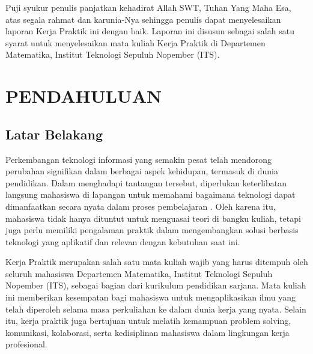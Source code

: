 \documentclass{file/KP-ITS}
\theoremstyle{definition}
\theoremstyle{definition}
\theoremstyle{plain}
\begin{document}

\BagianAwal
\Cover
\LembarJudul
\TitlePage
\LembarPengesahanDepartemen
\LembarPengesahanInstansi
\LembarOrisinalitas

\restoregeometry
\KataPengantar
Puji syukur penulis panjatkan kehadirat Allah SWT, Tuhan Yang Maha Esa, atas segala rahmat dan karunia-Nya sehingga penulis dapat menyelesaikan laporan Kerja Praktik ini dengan baik. Laporan ini disusun sebagai salah satu syarat untuk menyelesaikan mata kuliah Kerja Praktik di Departemen Matematika, Institut Teknologi Sepuluh Nopember (ITS).


\DaftarIsi

\DaftarGambar

\DaftarTabel





\BagianInti

\chapter{PENDAHULUAN}
\section{Latar Belakang}
Perkembangan teknologi informasi yang semakin pesat telah mendorong perubahan signifikan dalam berbagai aspek kehidupan, termasuk di dunia pendidikan. Dalam menghadapi tantangan tersebut, diperlukan keterlibatan langsung mahasiswa di lapangan untuk memahami bagaimana teknologi dapat dimanfaatkan secara nyata dalam proses pembelajaran \cite{suryadi2019}. Oleh karena itu, mahasiswa tidak hanya dituntut untuk menguasai teori di bangku kuliah, tetapi juga perlu memiliki pengalaman praktik dalam mengembangkan solusi berbasis teknologi yang aplikatif dan relevan dengan kebutuhan saat ini.

Kerja Praktik merupakan salah satu mata kuliah wajib yang harus ditempuh oleh seluruh mahasiswa Departemen Matematika, Institut Teknologi Sepuluh Nopember (ITS), sebagai bagian dari kurikulum pendidikan sarjana. Mata kuliah ini memberikan kesempatan bagi mahasiswa untuk mengaplikasikan ilmu yang telah diperoleh selama masa perkuliahan ke dalam dunia kerja yang nyata. Selain itu, kerja praktik juga bertujuan untuk melatih kemampuan problem solving, komunikasi, kolaborasi, serta kedisiplinan mahasiswa dalam lingkungan kerja profesional.
\end{document}
